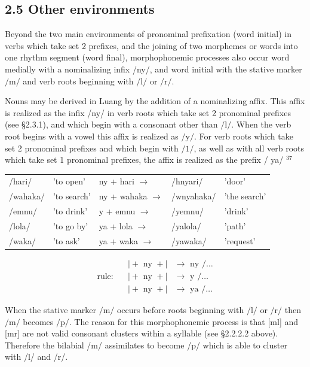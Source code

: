 \documentclass[10pt]{article}
\begin{document}
\subsection*{2.5 Other environments}
Beyond the two main environments of pronominal prefixation (word initial) in verbs which take set 2 prefixes, and the joining of two morphemes or words into one rhythm segment (word final), morphophonemic processes also occur word medially with a nominalizing infix /ny/, and word initial with the stative marker \(/ \mathrm{m} /\) and verb roots beginning with \(/ \mathrm{l} /\) or \(/ \mathrm{r} /\).

Nouns may be derived in Luang by the addition of a nominalizing affix. This affix is realized as the infix /ny/ in verb roots which take set 2 pronominal prefixes (see §2.3.1), and which begin with a consonant other than \(/ \mathrm{l} /\). When the verb root begins with a vowel this affix is realized as \(/ \mathrm{y} /\). For verb roots which take set 2 pronominal prefixes and which begin with \(/ 1 /\), as well as with all verb roots which take set 1 pronominal prefixes, the affix is realized as the prefix / ya/ \({ }^{37}\)

\begin{center}
\begin{tabular}{lllll}
/hari/ & 'to open' & ny + hari \(\rightarrow\) & /hnyari/ & 'door' \\
/wahaka/ & 'to search' & ny + wahaka \(\rightarrow\) & /wnyahaka/ & 'the search' \\
/emnu/ & 'to drink' & y + emnu \(\rightarrow\) & /yemnu/ & 'drink' \\
/lola/ & 'to go by' & ya + lola \(\rightarrow\) & /yalola/ & 'path' \\
/waka/ & 'to ask' & ya + waka \(\rightarrow\) & /yawaka/ & 'request' \\
\end{tabular}
\end{center}

\[
\text { rule: } \quad \begin{array}{ll}
\mid+ \text { ny }+\mid & \rightarrow \text { ny } / \ldots \\
\mid+ \text { ny }+\mid & \rightarrow \text { y } / \ldots \\
\mid+ \text { ny }+\mid & \rightarrow \text { ya } / \ldots
\end{array}
\]

When the stative marker \(/ \mathrm{m} /\) occurs before roots beginning with \(/ \mathrm{l} /\) or \(/ \mathrm{r} /\) then \(/ \mathrm{m} /\) becomes \(/ \mathrm{p} /\). The reason for this morphophonemic process is that [ml] and [mr] are not valid consonant clusters within a syllable (see §2.2.2.2 above). Therefore the bilabial /m/ assimilates to become /p/ which is able to cluster with /l/ and /r/.
\end{document}
